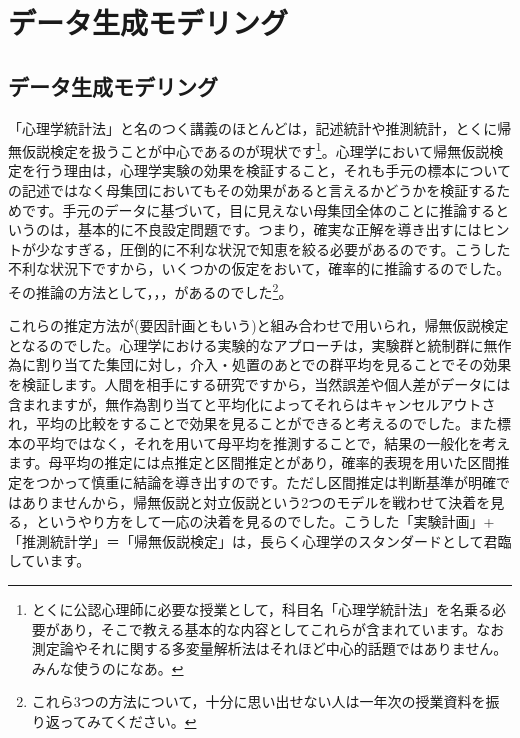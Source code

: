 \documentclass{ltjsbook}
\begin{document}
\chapter{データ生成モデリング}
\label{x17_Bayesian}

\section{データ生成モデリング}
「心理学統計法」と名のつく講義のほとんどは，記述統計や推測統計，とくに帰無仮説検定を扱うことが中心であるのが現状です\footnote{とくに公認心理師に必要な授業として，科目名「心理学統計法」を名乗る必要があり，そこで教える基本的な内容としてこれらが含まれています。なお測定論やそれに関する多変量解析法はそれほど中心的話題ではありません。みんな使うのになあ。}。心理学において帰無仮説検定を行う理由は，心理学実験の効果を検証すること，それも手元の標本についての記述ではなく母集団においてもその効果があると言えるかどうかを検証するためです。手元のデータに基づいて，目に見えない母集団全体のことに推論するというのは，基本的に不良設定問題です。つまり，確実な正解を導き出すにはヒントが少なすぎる，圧倒的に不利な状況で知恵を絞る必要があるのです。こうした不利な状況下ですから，いくつかの仮定をおいて，確率的に推論するのでした。その推論の方法として，，，があるのでした\footnote{これら3つの方法について，十分に思い出せない人は一年次の授業資料を振り返ってみてください。}。

これらの推定方法が(要因計画ともいう)と組み合わせで用いられ，帰無仮説検定となるのでした。心理学における実験的なアプローチは，実験群と統制群に無作為に割り当てた集団に対し，介入・処置のあとでの群平均を見ることでその効果を検証します。人間を相手にする研究ですから，当然誤差や個人差がデータには含まれますが，無作為割り当てと平均化によってそれらはキャンセルアウトされ，平均の比較をすることで効果を見ることができると考えるのでした。また標本の平均ではなく，それを用いて母平均を推測することで，結果の一般化を考えます。母平均の推定には点推定と区間推定とがあり，確率的表現を用いた区間推定をつかって慎重に結論を導き出すのです。ただし区間推定は判断基準が明確ではありませんから，帰無仮説と対立仮説という2つのモデルを戦わせて決着を見る，というやり方をして一応の決着を見るのでした。こうした「実験計画」+「推測統計学」＝「帰無仮説検定」は，長らく心理学のスタンダードとして君臨しています。
\end{document}
